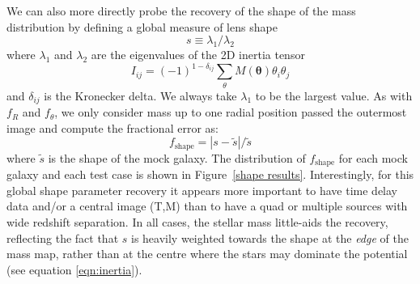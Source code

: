 \documentclass[galley,usenatbib]{mn2e}
\newcommand{\figref}[1] {Figure~\ref{#1}}
\renewcommand{\vec}[1]{\ensuremath{\boldsymbol{#1}}}
\begin{document}
We can also more directly probe the recovery of the shape of the mass
distribution by defining a global measure of lens shape
%
\begin{equation} 
    s \equiv \lambda_1/\lambda_2
\end{equation} 
%
where $\lambda_1$ and $\lambda_2$ are the eigenvalues of the 2D inertia tensor
%
\begin{equation} 
    I_{ij} = (-1)^{1-\delta_{ij}}\sum_\theta M(\vec\theta) \theta_i\theta_j 
\label{eqn:inertia}
\end{equation}
%
and $\delta_{ij}$ is the Kronecker delta. We always take $\lambda_1$ to be the largest value. As with $f_R$ and $f_\theta$, we only consider mass up to one radial position passed the outermost image and compute the fractional error as:
%
\begin{equation} \label{ferror shape}
  f_\mathrm{shape} = \left|s - \tilde s\right|  / \tilde s
\end{equation}
%
where $\tilde s$ is the shape of the mock galaxy. The distribution of
$f_\mathrm{shape}$ for each mock galaxy and each test case is shown in
\figref{shape results}.  Interestingly, for this global shape parameter
recovery it appears more important to have time delay data and/or a central
image (T,M) than to have a quad or multiple sources with wide redshift
separation. In all cases, the stellar mass little-aids the recovery, reflecting
the fact that $s$ is heavily weighted towards the shape at the {\it edge} of
the mass map, rather than at the centre where the stars may dominate the
potential (see equation \ref{eqn:inertia}).
\end{document}
